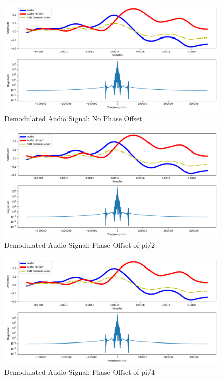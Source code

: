 \documentclass[
	letterpaper, %
	10pt, %
]{CSUniSchoolLabReport}
\begin{document}
\begin{lstlisting}[language=Python]
	

\end{lstlisting}

\begin{figure}[H] %
	\centering %
	\includegraphics[width=1.2\textwidth]{assignment3.png} %
	\caption{Demodulated Audio Signal: No Phase Offset}
	\label{fig:block}
\end{figure}

\begin{figure}[H] %
	\centering %
	\includegraphics[width=1.2\textwidth]{assignment3b.png} %
	\caption{Demodulated Audio Signal: Phase Offset of pi/2}
	\label{fig:block}
\end{figure}

\begin{figure}[H] %
	\centering %
	\includegraphics[width=1.2\textwidth]{assignment3c.png} %
	\caption{Demodulated Audio Signal: Phase Offset of pi/4}
	\label{fig:block}
\end{figure}
\end{document}
